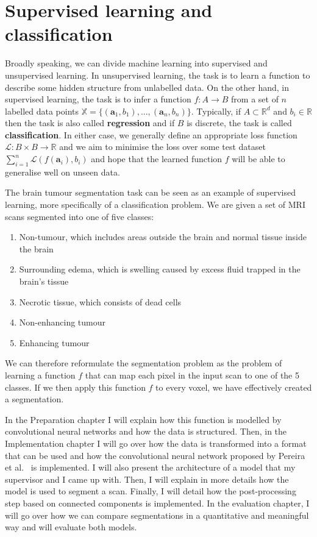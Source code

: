\documentclass[12pt,a4paper,twoside,openright]{report}
\begin{document}
\section{Supervised learning and classification}
Broadly speaking, we can divide machine learning into supervised and unsupervised learning. In unsupervised learning, the task is to learn a function to describe some hidden structure from unlabelled data. On the other hand, in supervised learning, the task is to infer a function $f: A \to B$ from a set of $n$ labelled data points $\mathbb{X} = \{(\textbf{a}_1, b_1), ..., (\textbf{a}_n, b_n)\}$. Typically, if $A \subset \mathbb{R}^d$ and $b_i \in \mathbb{R}$ then the task is also called \textbf{regression} and if $B$ is discrete, the task is called \textbf{classification}. In either case, we generally define an appropriate loss function $\mathcal{L}: B \times B \to \mathbb{R}$ and we aim to minimise the loss over some test dataset $\sum_{i=1}^n \mathcal{L}(f(\textbf{a}_i), b_i)$ and hope that the learned function $f$ will be able to generalise well on unseen data.

The brain tumour segmentation task can be seen as an example of supervised learning, more specifically of a classification problem. We are given a set of MRI scans segmented into one of five classes:
\begin{enumerate}
	\item Non-tumour, which includes areas outside the brain and normal tissue inside the brain
	\item Surrounding edema, which is swelling caused by excess fluid trapped in the brain's tissue
	\item Necrotic tissue, which consists of dead cells
	\item Non-enhancing tumour
	\item Enhancing tumour
\end{enumerate} 
We can therefore reformulate the segmentation problem as the problem of learning a function $f$ that can map each pixel in the input scan to one of the 5 classes. If we then apply this function $f$ to every voxel, we have effectively created a segmentation.

In the Preparation chapter I will explain how this function is modelled by convolutional neural networks and how the data is structured. Then, in the Implementation chapter I will go over how the data is transformed into a format that can be used and how the convolutional neural network proposed by Pereira et al.\ \cite{pereira} is implemented. I will also present the architecture of a model that my supervisor and I came up with. Then, I will explain in more details how the model is used to segment a scan. Finally, I will detail how the post-processing step based on connected components is implemented. In the evaluation chapter, I will go over how we can compare segmentations in a quantitative and meaningful way and will evaluate both models.
\end{document}

